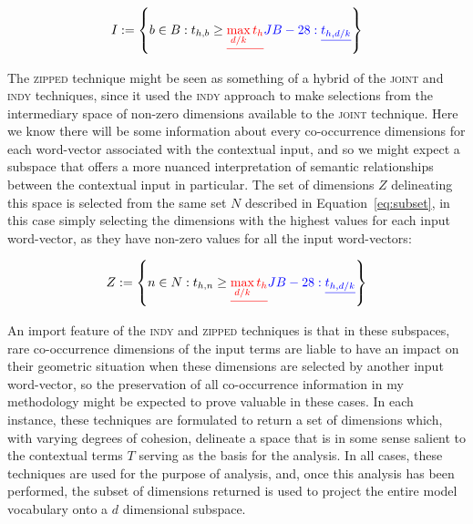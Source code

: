 \begin{equation}
I := \left \{b \in B: t_{h,b} \geq \del{\max_{d/k} t_h} \revJB{28}{t_{h,d/k}} \right \}
\end{equation}

\noindent The \textsc{zipped} technique might be seen as something of a hybrid of the \textsc{joint} and \textsc{indy} techniques, since it used the \textsc{indy} approach to make selections from the intermediary space of non-zero dimensions available to the \textsc{joint} technique.  Here we know there will be some information about every co-occurrence dimensions for each word-vector associated with the contextual input, and so we might expect a subspace that offers a more nuanced interpretation of semantic relationships between the contextual input in particular.  The set of dimensions $Z$ delineating this space is selected from the same set $N$ described in Equation~\ref{eq:subset}, in this case simply selecting the dimensions with the highest values for each input word-vector, as they have non-zero values for all the input word-vectors:

\begin{equation}
Z := \left \{n \in N: t_{h,n} \geq \del{\max_{d/k} t_h} \revJB{28}{t_{h,d/k}} \right \}
\end{equation}

\noindent An import feature of the \textsc{indy} and \textsc{zipped} techniques is that in these subspaces, rare co-occurrence dimensions of the input terms are liable to have an impact on their geometric situation when these dimensions are selected by another input word-vector, so the preservation of all co-occurrence information in my methodology might be expected to prove valuable in these cases.  In each instance, these techniques are formulated to return a set of dimensions which, with varying degrees of cohesion, delineate a space that is in some sense salient to the contextual terms $T$ serving as the basis for the analysis.  In all cases, these techniques are used for the purpose of analysis, and, once this analysis has been performed, the subset of dimensions returned is used to project the entire model vocabulary onto a $d$ dimensional subspace.


